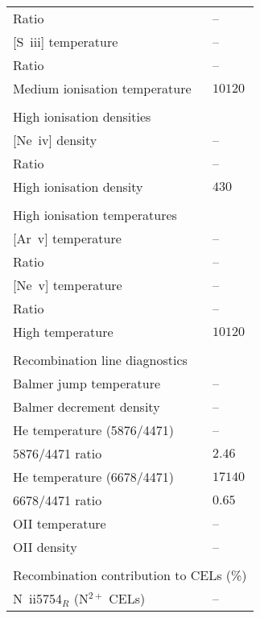 \begin{longtable}[l]{ll}
 Ratio                               & -- \\
 {}[S~{\sc iii}] temperature         & -- \\
 Ratio                               & -- \\
 Medium ionisation temperature       & $10120$\\
 \vspace{0.2cm}\\\multicolumn{2}{l}{High ionisation densities}\\ \hline
 {}[Ne~{\sc iv}] density             & -- \\
 Ratio                               & -- \\
 High ionisation density             & $  430$\\
 \vspace{0.2cm}\\\multicolumn{2}{l}{High ionisation temperatures}\\ \hline
 {}[Ar~{\sc v}] temperature          & -- \\
 Ratio                               & -- \\
 {}[Ne~{\sc v}] temperature          & -- \\
 Ratio                               & -- \\
 High temperature                    & $10120$\\
 \vspace{0.2cm}\\\multicolumn{2}{l}{Recombination line diagnostics}\\ \hline
 Balmer jump temperature             & -- \\
 Balmer decrement density            & -- \\
 He temperature (5876/4471)          & -- \\
 5876/4471 ratio                     & $  2.46$\\
 He temperature (6678/4471)          & $17140$\\
 6678/4471 ratio                     & $  0.65$\\
 OII temperature                     & -- \\
 OII density                         & -- \\
 \vspace{0.2cm}\\\multicolumn{2}{l}{Recombination contribution to CELs (\%)}\\ \hline
 N~{\sc ii}5754$_R$ (N$^{2+}$ CELs)  & -- \\

\end{longtable}
